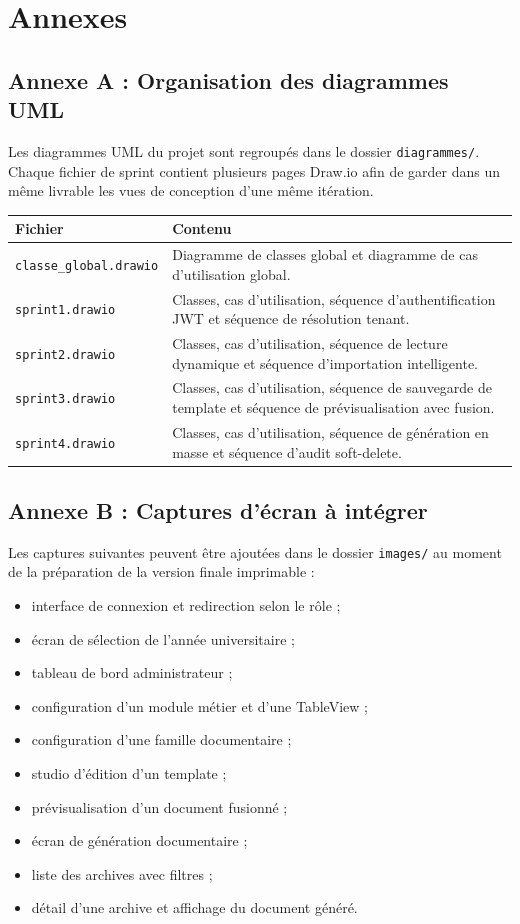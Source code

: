 \chapter*{Annexes}

\section*{Annexe A : Organisation des diagrammes UML}

Les diagrammes UML du projet sont regroupés dans le dossier \texttt{diagrammes/}. Chaque fichier de sprint contient plusieurs pages Draw.io afin de garder dans un même livrable les vues de conception d'une même itération.

\begin{longtable}{p{4cm} p{9cm}}
\toprule
\textbf{Fichier} & \textbf{Contenu} \\
\midrule
\texttt{classe\_global.drawio} & Diagramme de classes global et diagramme de cas d'utilisation global. \\
\texttt{sprint1.drawio} & Classes, cas d'utilisation, séquence d'authentification JWT et séquence de résolution tenant. \\
\texttt{sprint2.drawio} & Classes, cas d'utilisation, séquence de lecture dynamique et séquence d'importation intelligente. \\
\texttt{sprint3.drawio} & Classes, cas d'utilisation, séquence de sauvegarde de template et séquence de prévisualisation avec fusion. \\
\texttt{sprint4.drawio} & Classes, cas d'utilisation, séquence de génération en masse et séquence d'audit soft-delete. \\
\bottomrule
\end{longtable}

\section*{Annexe B : Captures d'écran à intégrer}

Les captures suivantes peuvent être ajoutées dans le dossier \texttt{images/} au moment de la préparation de la version finale imprimable :

\begin{itemize}
    \item interface de connexion et redirection selon le rôle ;
    \item écran de sélection de l'année universitaire ;
    \item tableau de bord administrateur ;
    \item configuration d'un module métier et d'une TableView ;
    \item configuration d'une famille documentaire ;
    \item studio d'édition d'un template ;
    \item prévisualisation d'un document fusionné ;
    \item écran de génération documentaire ;
    \item liste des archives avec filtres ;
    \item détail d'une archive et affichage du document généré.
\end{itemize}

